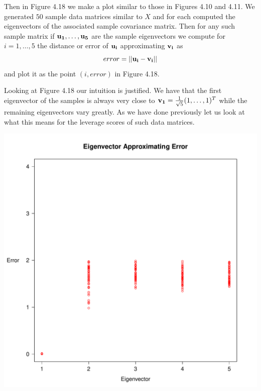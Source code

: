 \documentclass{book}
\begin{document}
Then in Figure 4.18 we make a plot similar to those in Figures 4.10 and 4.11. We generated $50$ sample data matrices similar to $X$ and for each computed the eigenvectors of the associated sample covariance matrix. Then for any such sample matrix if ${\bf u_1},\ldots,{\bf u_5}$ are the sample eigenvectors we compute for $i=1,\ldots, 5$ the distance or error of ${\bf u_i}$ approximating ${\bf v_i}$ as
$$
error=||{\bf u_i}-{\bf v_i}||
$$
and plot it as the point $(i,error)$ in Figure 4.18. 

Looking at Figure 4.18 our intuition is justified. We have that the first eigenvector of the samples is always very close to ${\bf v_1}=\frac{1}{\sqrt{5}}(1,\ldots,1)^T$ while the remaining eigenvectors vary greatly. As we have done previously let us look at what this means for the leverage scores of such data matrices. 

\newpage
\begin{center}
\includegraphics[scale=.53]{./Figures/cs_ex_1/eigen.pdf}
\end{center}
\end{document}
